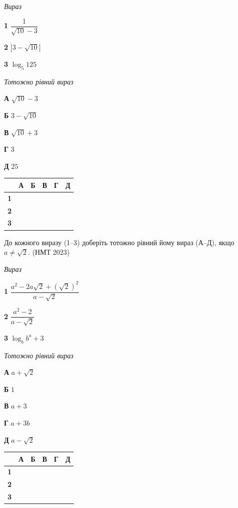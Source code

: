 \documentclass[14pt]{extarticle}
\newcommand{\matchTable}{
\begin{tabular}{|>{\centering\arraybackslash}p{0.3cm}|*{5}{>{\centering\arraybackslash}p{0.3cm}|}}
\hline
& \textbf{А} & \textbf{Б} & \textbf{В} & \textbf{Г} & \textbf{Д} \\
\hline
\textbf{1} & \rule{0pt}{0.3cm} & & & & \\
\hline
\textbf{2} & \rule{0pt}{0.3cm} & & & & \\
\hline
\textbf{3} & \rule{0pt}{0.3cm} & & & & \\
\hline
\end{tabular}
}
\newcommand{\task}[2]{\noindent\makebox[1.5em][l]{\textbf{#1.}}\parbox[t]{\dimexpr\textwidth-1.5em}{#2}}
\newcommand{\nmtyear}[1]{\hfill{\small\color{yearcolor}(НМТ #1)}}
\begin{document}
\vspace{0.3cm}
\begin{minipage}{0.35\textwidth}
\textit{Вираз}

\vspace{0.3cm}
\textbf{1} \quad $\dfrac{1}{\sqrt{10} - 3}$

\vspace{0.2cm}
\textbf{2} \quad $|3 - \sqrt{10}|$

\vspace{0.2cm}
\textbf{3} \quad $\log_5 125$
\end{minipage}
\hfill
\begin{minipage}{0.3\textwidth}
\textit{Тотожно рівний вираз}

\vspace{0.2cm}
\textbf{А} \quad $\sqrt{10} - 3$

\vspace{0.2cm}
\textbf{Б} \quad $3 - \sqrt{10}$

\vspace{0.2cm}
\textbf{В} \quad $\sqrt{10} + 3$

\vspace{0.2cm}
\textbf{Г} \quad $3$

\vspace{0.2cm}
\textbf{Д} \quad $25$
\end{minipage}
\hfill
\begin{minipage}{0.2\textwidth}
\matchTable
\end{minipage}

\task{21}{До кожного виразу (1--3) доберіть тотожно рівний йому вираз (А--Д), якщо $a \neq \sqrt{2}$. \nmtyear{2023}}

\vspace{0.3cm}
\begin{minipage}{0.4\textwidth}
\textit{Вираз}

\vspace{0.3cm}
\textbf{1} \quad $\dfrac{a^2 - 2a\sqrt{2} + (\sqrt{2})^2}{a - \sqrt{2}}$

\vspace{0.4cm}
\textbf{2} \quad $\dfrac{a^2 - 2}{a - \sqrt{2}}$

\vspace{0.3cm}
\textbf{3} \quad $\log_b b^a + 3$
\end{minipage}
\hfill
\begin{minipage}{0.3\textwidth}
\textit{Тотожно рівний вираз}

\vspace{0.2cm}
\textbf{А} \quad $a + \sqrt{2}$

\vspace{0.2cm}
\textbf{Б} \quad $1$

\vspace{0.2cm}
\textbf{В} \quad $a + 3$

\vspace{0.2cm}
\textbf{Г} \quad $a + 3b$

\vspace{0.2cm}
\textbf{Д} \quad $a - \sqrt{2}$
\end{minipage}
\hfill
\begin{minipage}{0.2\textwidth}
\matchTable
\end{minipage}
\end{document}
